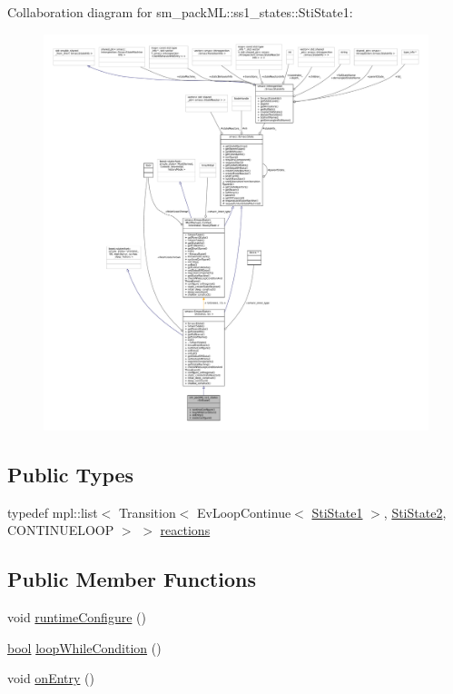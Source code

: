 Collaboration diagram for sm\+\_\+pack\+ML\+:\+:ss1\+\_\+states\+:\+:Sti\+State1\+:
\nopagebreak
\begin{figure}[H]
\begin{center}
\leavevmode
\includegraphics[width=350pt]{structsm__packML_1_1ss1__states_1_1StiState1__coll__graph}
\end{center}
\end{figure}
\subsection*{Public Types}
\begin{DoxyCompactItemize}
\item 
typedef mpl\+::list$<$ Transition$<$ Ev\+Loop\+Continue$<$ \hyperlink{structsm__packML_1_1ss1__states_1_1StiState1}{Sti\+State1} $>$, \hyperlink{structsm__packML_1_1ss1__states_1_1StiState2}{Sti\+State2}, C\+O\+N\+T\+I\+N\+U\+E\+L\+O\+OP $>$ $>$ \hyperlink{structsm__packML_1_1ss1__states_1_1StiState1_aba10fe558b600aa2aa77e046d6a35e66}{reactions}
\end{DoxyCompactItemize}
\subsection*{Public Member Functions}
\begin{DoxyCompactItemize}
\item 
void \hyperlink{structsm__packML_1_1ss1__states_1_1StiState1_ae858bcf02df8051b1f30ef86260c6b5d}{runtime\+Configure} ()
\item 
\hyperlink{classbool}{bool} \hyperlink{structsm__packML_1_1ss1__states_1_1StiState1_a118a1773c4bdee4e684a8212af496364}{loop\+While\+Condition} ()
\item 
void \hyperlink{structsm__packML_1_1ss1__states_1_1StiState1_a3a0fd8617b7234db72cbd87bfdc7801e}{on\+Entry} ()
\end{DoxyCompactItemize}
